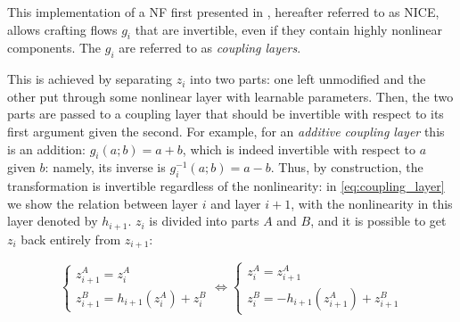 \documentclass[../main.tex]{subfiles}
\begin{document}
This implementation of a NF first presented in \cite{dinhNICE2015}, hereafter referred to as NICE, allows crafting flows $g_i$ that are invertible, even if they contain highly nonlinear components.
The $g_i$ are referred to as \emph{coupling layers}.

This is achieved by separating $z_i$ into two parts: one left unmodified and the other put through some nonlinear layer with learnable parameters.
Then, the two parts are passed to a coupling layer that should be invertible with respect to its first argument given the second.
For example, for an \emph{additive coupling layer} this is an addition: $g_i(a; b) = a + b$, which is indeed invertible with respect to $a$ given $b$: namely, its inverse is $g_i^{-1}(a; b) = a - b$.
Thus, by construction, the transformation is invertible regardless of the nonlinearity: in \autoref{eq:coupling_layer} we show the relation between layer $i$ and layer $i+1$, with the nonlinearity in this layer denoted by $h_{i+1}$. $z_i$ is divided into parts $A$ and $B$, and it is possible to get $z_i$ back entirely from $z_{i+1}$:

\begin{equation}
    \label{eq:coupling_layer}
    \begin{cases}
        z_{i+1}^A = z_i^A \\
        z_{i+1}^B = h_{i+1}(z_i^A) + z_i^B
    \end{cases}
    \Leftrightarrow
    \begin{cases}
        z_i^A = z_{i+1}^A \\
        z_i^B = -h_{i+1}(z_{i+1}^A) + z_{i+1}^B
    \end{cases}
\end{equation}
\end{document}
